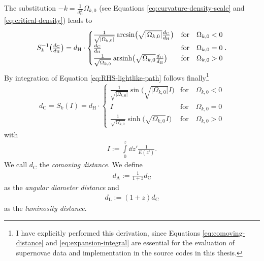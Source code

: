 The substitution $\displaystyle -k = \frac{1}{d_{\text{H}}^{2}}\Omega_{k,0}$ (see Equations \eqref{eq:curvature-density-scale} and \eqref{eq:critical-density}) leads to
\begin{align}
    S^{-1}_{k} \bigl( \tfrac{d_{\text{C}}}{d_{\text{H}}} \bigr) = d_{\text{H}} \cdot \begin{cases} 
                                                                                        \frac{1}{\sqrt{\vert \Omega_{k,0} \vert}} \arcsin \bigl(\sqrt{\vert \Omega_{k,0} \vert} \frac{d_{\text{C}}}{d_{\text{H}}} \bigr) &\text{for} \quad \Omega_{k,0} < 0  \\ 
                                                                                        \frac{d_{\text{C}}}{d_{\text{H}}} &\text{for} \quad \Omega_{k,0} = 0 \\ 
                                                                                        \frac{1}{\sqrt{\Omega_{k,0}}} \operatorname{arsinh} \bigl(\sqrt{\Omega_{k,0}} \frac{d_{\text{C}}}{d_{\text{H}}}\bigr) &\text{for} \quad \Omega_{k,0} > 0 
                                                                                                                                                                                               \end{cases}. \label{eq:LHS-lightlike-path}
\end{align}
By integration of Equation \eqref{eq:RHS-lightlike-path} follows finally\footnote{I have explicitly performed this derivation, since Equations \eqref{eq:comoving-distance} and \eqref{eq:expansion-integral} are essential for the evaluation of supernovae data and implementation in the source codes in this thesis.}
\begin{align}
    d_{\text{C}} = S_{k}(I) = d_{\text{H}} \cdot \begin{cases} 
                                                    \frac{1}{\sqrt{\vert \Omega_{k,0} \vert}} \sin \bigl(\sqrt{\vert \Omega_{k,0} \vert} I \bigr) &\text{for} \quad \Omega_{k,0} < 0 \\ 
                                                    I &\text{for} \quad \Omega_{k,0} = 0 \\  
                                                \frac{1}{\sqrt{\Omega_{k,0}}} \sinh \bigl(\sqrt{\Omega_{k,0}} I \bigr)  &\text{for} \quad \Omega_{k,0} > 0 
                                                \end{cases} \label{eq:comoving-distance} 
\end{align}
with 
\begin{align}
    I := \int\limits_{0}^{z} \dd{z'} \frac{1}{E(z')}. \label{eq:expansion-integral}  
\end{align}
We call $d_{\text{C}}$ the \textit{comoving distance}.
We define 
\begin{align}
    d_{\text{A}} := \frac{1}{1+z} d_{\text{C}} \label{eq:angular-diameter-distance}
\end{align}
as the \textit{angular diameter distance} and 
\begin{align}
    d_{\text{L}} := (1 + z) d_{\text{C}} \label{eq:luminosity-distance}
\end{align}
as the \textit{luminosity distance}.

